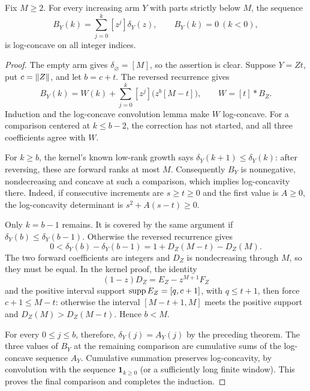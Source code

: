\begin{theorem}
Fix $M\ge2$. For every increasing arm $Y$ with parts strictly below $M$,
the sequence
\[
 B_Y(k)=\sum_{j=0}^k[z^j]\delta_Y(z),\qquad B_Y(k)=0\ (k<0),
\]
is log-concave on all integer indices.
\end{theorem}

\begin{proof}
The empty arm gives $\delta_\varnothing=[M]$, so the assertion is clear.
Suppose $Y=Zt$, put $c=\lVert Z\rVert$, and let $b=c+t$. The reversed recurrence
gives
\[
 B_Y(k)=W(k)+\sum_{j=0}^k[z^j]\bigl(z^b[M-t]\bigr),\qquad
 W=[t]*B_Z.
\]
Induction and the log-concave convolution lemma make $W$ log-concave.
For a comparison centered at $k\le b-2$, the correction has not started,
and all three coefficients agree with $W$.

For $k\ge b$, the kernel's known low-rank growth says
$\delta_Y(k+1)\le\delta_Y(k)$: after reversing, these are forward ranks
at most $M$. Consequently $B_Y$ is nonnegative, nondecreasing and
concave at such a comparison, which implies log-concavity there.
Indeed, if consecutive increments are $s\ge t\ge0$ and the first value
is $A\ge0$, the log-concavity determinant is $s^2+A(s-t)\ge0$.

Only $k=b-1$ remains. It is covered by the same argument if
$\delta_Y(b)\le\delta_Y(b-1)$. Otherwise the reversed recurrence gives
\[
 0<\delta_Y(b)-\delta_Y(b-1)
   =1+D_Z(M-t)-D_Z(M).
\]
The two forward coefficients are integers and $D_Z$ is nondecreasing
through $M$, so they must be equal. In the kernel proof, the identity
\[
 (1-z)D_Z=E_Z-z^{M+1}F_Z
\]
and the positive interval support $\operatorname{supp} E_Z=[q,c+1]$, with $q\le t+1$,
then force $c+1\le M-t$: otherwise the interval $[M-t+1,M]$ meets the
positive support and $D_Z(M)>D_Z(M-t)$. Hence $b<M$.

For every $0\le j\le b$, therefore, $\delta_Y(j)=A_Y(j)$ by the preceding
theorem. The three values of $B_Y$ at the remaining comparison are
cumulative sums of the log-concave sequence $A_Y$. Cumulative summation
preserves log-concavity, by convolution with the sequence
$\mathbf1_{k\ge0}$ (or a sufficiently long finite window). This proves
the final comparison and completes the induction.
\end{proof}

